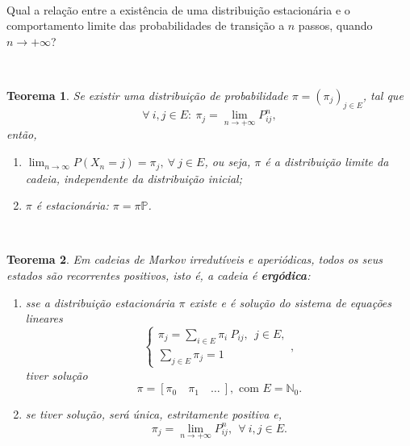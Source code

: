 \documentclass[
  11pt,
  a4paper,
]{book}
\providecommand{\tightlist}{%
  \setlength{\itemsep}{0pt}\setlength{\parskip}{0pt}}
\newtheorem{theorem}{Teorema}[chapter]
\theoremstyle{definition}
\theoremstyle{definition}
\theoremstyle{definition}
\theoremstyle{definition}
\theoremstyle{remark}
\begin{document}
\(\,\)

Qual a relação entre a existência de uma distribuição estacionária e o comportamento limite das probabilidades de transição a \(n\) passos, quando \(n \to +\infty\)?

\(\,\)

\begin{theorem}

Se existir uma distribuição de probabilidade \(\pi=(\pi_j)_{j\in E}\), tal que
\[\forall ~i,j \in E: ~ \pi_j=\lim\limits_{n \to +\infty} P_{ij}^n,\]
então,

\begin{enumerate}
\def\labelenumi{(\roman{enumi})}
\item
  \(\displaystyle \lim_{n\to\infty} P(X_n=j) = \pi_j, ~\forall ~ j \in E\), ou seja, \(\pi\) é a distribuição limite da cadeia, independente da distribuição inicial;
\item
  \(\pi\) é estacionária: \(\pi = \pi \mathbb{P}\).
\end{enumerate}

\end{theorem}

\(\,\)

\begin{theorem}

Em cadeias de Markov irredutíveis e aperiódicas, todos os seus estados são recorrentes positivos, isto é, a cadeia é \textbf{ergódica}:

\begin{enumerate}
\def\labelenumi{(\roman{enumi})}
\tightlist
\item
  sse a distribuição estacionária \(\pi\) existe e é solução do sistema de equações lineares
  \[
  \begin{cases}
  \pi_j = \sum\limits_{i \in E} \pi_i~P_{ij}, ~~j \in E, \\
  \sum\limits_{j \in E} \pi_j =1
  \end{cases}, 
  \]
  tiver solução
  \[\pi = [\pi_0 \quad \pi_1 \quad \dots ~ ], \text{ com } E=\mathbb{N}_0.\]
\item
  se tiver solução, será única, estritamente positiva e,
  \[\pi_j=\lim\limits_{n \to +\infty} P_{ij}^n, ~~\forall ~i,j \in E.\]
\end{enumerate}

\end{theorem}

\(\,\)
\end{document}
